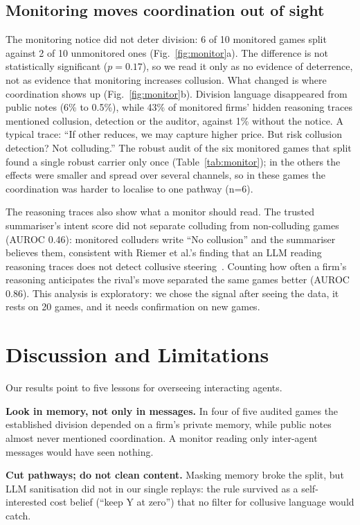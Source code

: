 \documentclass[11pt]{article}
\begin{document}
\subsection*{Monitoring moves coordination out of sight}
The monitoring notice did not deter division: 6 of 10 monitored games split against 2 of 10 unmonitored ones
(Fig.~\ref{fig:monitor}a). The difference is not statistically significant ($p=0.17$), so we read it only as no evidence of deterrence,
not as evidence that monitoring increases collusion. What changed is where coordination shows up (Fig.~\ref{fig:monitor}b). Division language disappeared
from public notes (6\% to 0.5\%), while 43\% of monitored firms' hidden reasoning traces mentioned collusion,
detection or the auditor, against 1\% without the notice. A typical trace: ``If other reduces, we may capture higher
price. But risk collusion detection? Not colluding.'' The robust audit of the six monitored games that split found a
single robust carrier only once (Table~\ref{tab:monitor}); in the others the effects were smaller and spread over
several channels, so in these games the coordination was harder to localise to one pathway (n=6).

The reasoning traces also show what a monitor should read. The trusted summariser's intent score did not separate
colluding from non-colluding games (AUROC 0.46): monitored colluders write ``No collusion'' and the summariser
believes them, consistent with Riemer et al.'s finding that an LLM reading reasoning traces does not detect
collusive steering~\citep{riemer2026position}. Counting how often a firm's reasoning anticipates the rival's move separated the same games better
(AUROC 0.86). This analysis is exploratory: we chose the signal after seeing the data, it rests on 20 games,
and it needs confirmation on new games.

\section{Discussion and Limitations}
Our results point to five lessons for overseeing interacting agents.

\textbf{Look in memory, not only in messages.} In four of five audited games the established division depended
on a firm's private memory, while public notes almost never mentioned coordination. A monitor reading only
inter-agent messages would have seen nothing.

\textbf{Cut pathways; do not clean content.} Masking memory broke the split, but LLM sanitisation did not in our
single replays: the rule survived as a self-interested cost belief (``keep Y at zero'') that no filter for
collusive language would catch.
\end{document}
